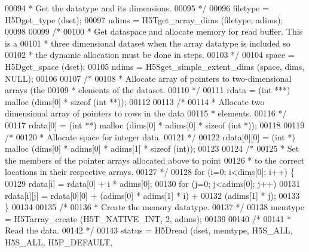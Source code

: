 \begin{DoxyCode}
00094 \textcolor{comment}{     * Get the datatype and its dimensions.}
00095 \textcolor{comment}{     */}
00096     filetype = H5Dget\_type (dset);
00097     ndims = H5Tget\_array\_dims (filetype, adims);
00098 
00099     \textcolor{comment}{/*}
00100 \textcolor{comment}{     * Get dataspace and allocate memory for read buffer.  This is a}
00101 \textcolor{comment}{     * three dimensional dataset when the array datatype is included so}
00102 \textcolor{comment}{     * the dynamic allocation must be done in steps.}
00103 \textcolor{comment}{     */}
00104     space = H5Dget\_space (dset);
00105     ndims = H5Sget\_simple\_extent\_dims (space, dims, NULL);
00106 
00107     \textcolor{comment}{/*}
00108 \textcolor{comment}{     * Allocate array of pointers to two-dimensional arrays (the}
00109 \textcolor{comment}{     * elements of the dataset.}
00110 \textcolor{comment}{     */}
00111     rdata = (\textcolor{keywordtype}{int} ***) malloc (dims[0] * \textcolor{keyword}{sizeof} (\textcolor{keywordtype}{int} **));
00112 
00113     \textcolor{comment}{/*}
00114 \textcolor{comment}{     * Allocate two dimensional array of pointers to rows in the data}
00115 \textcolor{comment}{     * elements.}
00116 \textcolor{comment}{     */}
00117     rdata[0] = (\textcolor{keywordtype}{int} **) malloc (dims[0] * adims[0] * \textcolor{keyword}{sizeof} (\textcolor{keywordtype}{int} *));
00118 
00119     \textcolor{comment}{/*}
00120 \textcolor{comment}{     * Allocate space for integer data.}
00121 \textcolor{comment}{     */}
00122     rdata[0][0] = (\textcolor{keywordtype}{int} *) malloc (dims[0] * adims[0] * adims[1] * \textcolor{keyword}{sizeof} (\textcolor{keywordtype}{int}));
00123 
00124     \textcolor{comment}{/*}
00125 \textcolor{comment}{     * Set the members of the pointer arrays allocated above to point}
00126 \textcolor{comment}{     * to the correct locations in their respective arrays.}
00127 \textcolor{comment}{     */}
00128     \textcolor{keywordflow}{for} (i=0; i<dims[0]; i++) \{
00129         rdata[i] = rdata[0] + i * adims[0];
00130         \textcolor{keywordflow}{for} (j=0; j<adims[0]; j++)
00131             rdata[i][j] = rdata[0][0] + (adims[0] * adims[1] * i) +
00132                         (adims[1] * j);
00133     \}
00134 
00135     \textcolor{comment}{/*}
00136 \textcolor{comment}{     * Create the memory datatype.}
00137 \textcolor{comment}{     */}
00138     memtype = H5Tarray\_create (H5T\_NATIVE\_INT, 2, adims);
00139 
00140     \textcolor{comment}{/*}
00141 \textcolor{comment}{     * Read the data.}
00142 \textcolor{comment}{     */}
00143     status = H5Dread (dset, memtype, H5S\_ALL, H5S\_ALL, H5P\_DEFAULT,

\end{DoxyCode}
